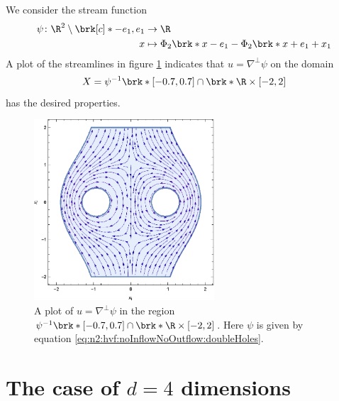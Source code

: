 \begin{example}
  We consider the stream function
  \begin{equation}
    \begin{aligned}
    \psi\colon\R^2\setminus\brk[c]*{-e_1,e_1}&\to\R \\
    x&\mapsto\Phi_2\brk*{x-e_1}-\Phi_2\brk*{x+e_1}+x_1
    \end{aligned}\label{eq:n2:hvf:noInflowNoOutflow:doubleHoles}
  \end{equation}
  A plot of the streamlines in figure \ref{pl:n2_hvf_InflowOutflow_symmetric_region} indicates that $u=\nabla^\perp\psi$ 
  on the domain
  $$X=\psi^{-1}\brk*{[-0.7,0.7]}\cap \brk*{\R\times[-2,2]}$$
  has the desired properties.
  \begin{figure}
    \centering
    \includegraphics[width=0.6\textwidth]{../Plots/HarmonicVectorFields_gr2.eps}
    \caption{A plot of $u=\nabla^\perp\psi$ in the region $\psi^{-1}\brk*{[-0.7,0.7]}\cap \brk*{\R\times[-2,2]}$.
    Here $\psi$ is given by equation \eqref{eq:n2:hvf:noInflowNoOutflow:doubleHoles}.}
    \label{pl:n2_hvf_InflowOutflow_symmetric_region}
  \end{figure}
\end{example}

\section{The case of $d=4$ dimensions}

